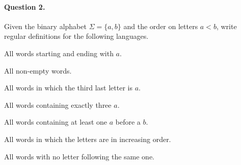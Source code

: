 \paragraph{Question 2.}

Given the binary alphabet \(\Sigma = \{a, b\}\) and the order on
letters \(a < b\), write regular definitions for the following
languages.
\begin{enumerate*}

  \item All words starting and ending with \(a\).

  \item All non-empty words.

  \item All words in which the third last letter is \(a\).

  \item All words containing exactly three \(a\).

  \item All words containing at least one \(a\) before a \(b\).

  \item All words in which the letters are in increasing order.

  \item All words with no letter following the same one.

\end{enumerate*}
